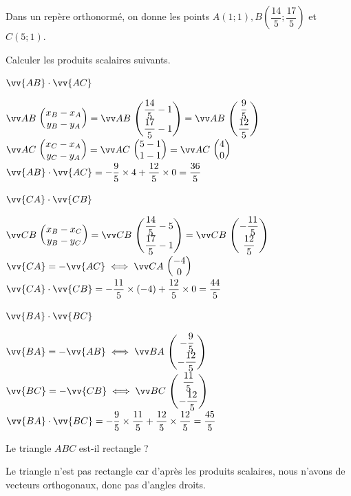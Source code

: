 \documentclass[11pt,a4paper]{article}  %
\begin{document}
\exercice{}
Dans un repère orthonormé, on donne les points $A(1 ; 1), B\left(\dfrac{14}{5} ; \dfrac{17}{5}\right)$ et $C(5 ; 1)$.
\begin{enumMet}
	\item Calculer les produits scalaires suivants.
	\begin{enumMet}
		\item $\vv{A B} \cdot \vv{A C}$
		\begin{corrBox}
			$\Coord{AB}{x_B-x_A}{y_B-y_A}=\Coord{AB}{\dfrac{14}{5}-1}{\dfrac{17}{5}-1}=\Coord{AB}{\dfrac{9}{5}}{\dfrac{12}{5}}$\quad$\Coord{AC}{x_C-x_A}{y_C-y_A}=\Coord{AC}{5-1}{1-1}=\Coord{AC}{4}{0}$
			$\vv{A B} \cdot \vv{A C}=-\dfrac{9}{5}\times 4+\dfrac{12}{5}\times 0=\dfrac{36}{5}$
		\end{corrBox}
		\item $\vv{C A} \cdot \vv{C B}$
		\begin{corrBox}
			$\Coord{CB}{x_B-x_C}{y_B-y_C}=\Coord{CB}{\dfrac{14}{5}-5}{\dfrac{17}{5}-1}=\Coord{CB}{-\dfrac{11}{5}}{\dfrac{12}{5}}$\quad\quad $\vv{CA}=-\vv{AC} \iff \Coord{CA}{-4}{0}$\\
			$\vv{CA} \cdot \vv{CB}=-\dfrac{11}{5}\times (-4)+\dfrac{12}{5}\times 0=\dfrac{44}{5}$
		\end{corrBox}
		\item $\vv{B A} \cdot \vv{B C}$
		\begin{corrBox}
			$\vv{BA}=-\vv{AB} \iff \Coord{BA}{-\dfrac{9}{5}}{-\dfrac{12}{5}}$\quad\quad $\vv{BC}=-\vv{CB} \iff \Coord{BC}{\dfrac{11}{5}}{-\dfrac{12}{5}}$\\
			$\vv{BA} \cdot \vv{BC}=-\dfrac{9}{5}\times \dfrac{11}{5}+\dfrac{12}{5}\times \dfrac{12}{5}=\dfrac{45}{5}$
		\end{corrBox}
	\end{enumMet}
	\item Le triangle $A B C$ est-il rectangle ?
	\begin{corrBox}
		Le triangle n'est pas rectangle car d'après les produits scalaires, nous n'avons de vecteurs orthogonaux, donc pas d'angles droits.
	\end{corrBox}
\end{enumMet}
\end{document}
